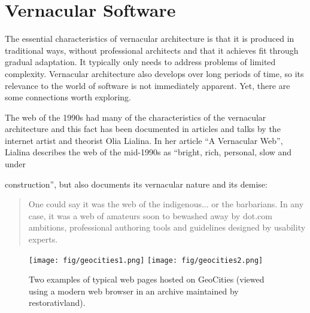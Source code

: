 \section{Vernacular Software}


The essential characteristics of vernacular architecture is that it is produced in traditional
ways, without professional architects and that it achieves fit through gradual adaptation.
It typically only needs to address problems of limited complexity. Vernacular architecture
also develops over long periods of time, so its relevance to the world of software is not
immediately apparent. Yet, there are some connections worth exploring.

The web of the 1990s had many of the characteristics of the vernacular architecture and this
fact has been documented in articles and talks by the internet artist and theorist
Olia Lialina. In her article ``A Vernacular Web'',
Lialina describes the web of the mid-1990s as ``bright, rich, personal, slow and under

construction'', but also documents its vernacular nature and its demise:
\begin{quote}
One could say it was the web of the indigenous... or the barbarians. In any case, it was a web
of amateurs soon to bewashed away by dot.com ambitions, professional authoring tools and
guidelines designed by usability experts.
\end{quote}

\begin{figure}
\centering
\texttt{[image: fig/geocities1.png]}
\texttt{[image: fig/geocities2.png]}
\caption{Two examples of typical web pages hosted on GeoCities (viewed using a modern
web browser in an archive maintained by restorativland).}
\label{fig:geocities}
\end{figure}


